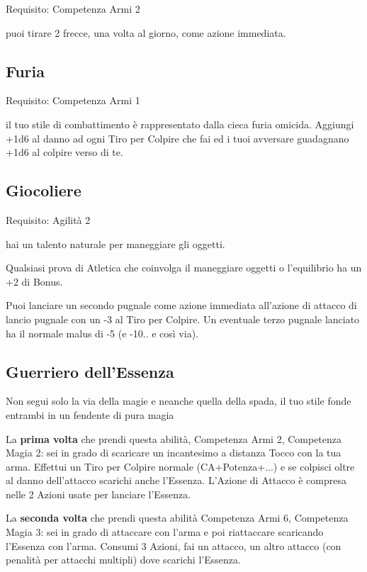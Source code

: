 \documentclass[a4paper,11pt,twoside,openany]{book}
\begin{document}
Requisito: Competenza Armi 2

puoi tirare 2 frecce, una volta al giorno, come azione immediata.

\subsection{Furia}

Requisito: Competenza Armi 1

il tuo stile di combattimento è rappresentato dalla cieca furia omicida. Aggiungi +1d6 al danno ad ogni Tiro per Colpire che fai ed i tuoi avversare guadagnano +1d6 al colpire verso di te. 

\subsection{Giocoliere}

Requisito: Agilità 2

hai un talento naturale per maneggiare gli oggetti.

Qualsiasi prova di Atletica che coinvolga il maneggiare oggetti o l'equilibrio ha un +2 di Bonus.

Puoi lanciare un secondo pugnale come azione immediata all'azione di attacco di lancio pugnale con un -3 al Tiro per Colpire. Un eventuale terzo pugnale lanciato ha il normale malus di -5 (e -10.. e così via).

\subsection{Guerriero dell'Essenza}

Non segui solo la via della magie e neanche quella della spada, il tuo stile fonde entrambi in un fendente di pura magia

La \textbf{prima volta} che prendi questa abilità, Competenza Armi 2, Competenza Magia 2: sei in grado di scaricare un incantesimo a distanza Tocco con la tua arma. Effettui un Tiro per Colpire normale (CA+Potenza+...) e se colpisci oltre al danno dell'attacco scarichi anche l'Essenza. L'Azione di Attacco è compresa nelle 2 Azioni usate per lanciare l'Essenza.

La \textbf{seconda volta} che prendi questa abilità Competenza Armi 6, Competenza Magia 3: sei in grado di attaccare con l'arma e poi riattaccare scaricando l'Essenza con l'arma. Consumi 3 Azioni, fai un attacco, un altro attacco (con penalità per attacchi multipli) dove scarichi l'Essenza.
\end{document}
